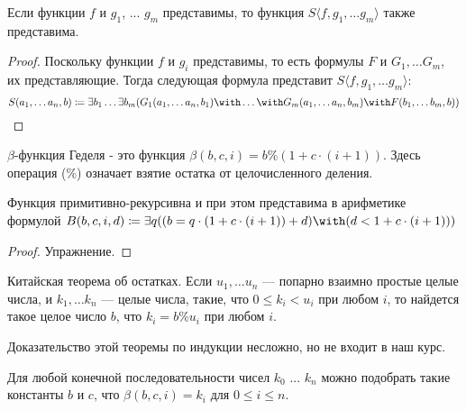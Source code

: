 \begin{theorem} Если функции $f$ и $g_1$, ... $g_m$ представимы, 
то функция $S\langle{}f,g_1,\dots g_m\rangle$ также представима. \end{theorem}
\begin{proof}Поскольку функции $f$ и $g_i$ представимы, то есть формулы $F$ и $G_1, \dots G_m$,
их представляющие. Тогда следующая формула представит $S\langle{}f,g_1,\dots g_m\rangle$: 
$$S (a_1, \dots a_n, b) \coloneqq  \exists b_1 \dots \exists b_m 
  (G_1 (a_1, \dots a_n, b_1) \with \dots \with G_m (a_1, \dots a_n, b_m) \with F (b_1, \dots b_m, b))$$
\end{proof}

\begin{definition}
$\beta$-функция Геделя - это функция $\beta (b,c,i) = b \% (1 + c \cdot (i + 1))$. Здесь операция (\%) означает
взятие остатка от целочисленного деления.
\end{definition}

\begin{lemma}Функция примитивно-рекурсивна и при этом представима в арифметике 
формулой $B (b,c,i,d) \coloneqq  \exists q ((b = q \cdot (1 + c \cdot (i+1)) + d) \with (d < 1 + c \cdot (i+1)))$
\end{lemma}
\begin{proof}Упражнение.\end{proof}

\begin{theorem}Китайская теорема об остатках.
Если $u_1, \dots u_n$ --- попарно взаимно простые целые числа,
и $k_1, \dots k_n$ --- целые числа, такие, что $0 \le k_i < u_i$
при любом $i$, то найдется такое целое число $b$, что
$k_i = b \% u_i$ при любом $i$.
\end{theorem}

Доказательство этой теоремы по индукции несложно, но не входит в наш курс. 

\begin{lemma} 
Для любой конечной последовательности чисел $k_0$ ... $k_n$ можно подобрать
такие константы $b$ и $c$, что $\beta (b,c,i) = k_i$ для $0 \le i \le n$.
\end{lemma}

